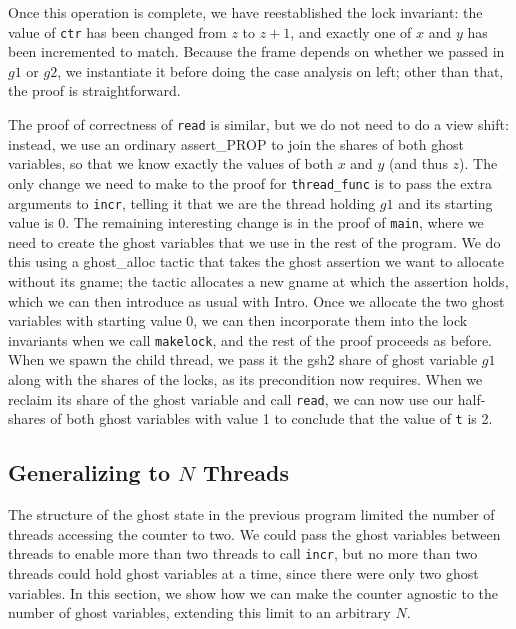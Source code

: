\documentclass[11pt]{article} %
\begin{document}
Once this operation is complete, we have reestablished the lock invariant: the value of \texttt{ctr} has been changed from $z$ to $z + 1$, and exactly one of $x$ and $y$ has been incremented to match. Because the frame depends on whether we passed in $g1$ or $g2$, we instantiate it before doing the case analysis on \textsf{left}; other than that, the proof is straightforward.

The proof of correctness of \texttt{read} is similar, but we do not need to do a view shift: instead, we use an ordinary \textsf{assert\_PROP} to join the shares of both ghost variables, so that we know exactly the values of both $x$ and $y$ (and thus $z$). The only change we need to make to the proof for \texttt{thread\_func} is to pass the extra arguments to \texttt{incr}, telling it that we are the thread holding $g1$ and its starting value is 0. The remaining interesting change is in the proof of \texttt{main}, where we need to create the ghost variables that we use in the rest of the program. We do this using a \textsf{ghost\_alloc} tactic that takes the ghost assertion we want to allocate without its \textsf{gname}; the tactic allocates a new \textsf{gname} at which the assertion holds, which we can then introduce as usual with \textsf{Intro}. Once we allocate the two ghost variables with starting value 0, we can then incorporate them into the lock invariants when we call \texttt{makelock}, and the rest of the proof proceeds as before. When we spawn the child thread, we pass it the \textsf{gsh2} share of ghost variable $g1$ along with the shares of the locks, as its precondition now requires. When we reclaim its share of the ghost variable and call \texttt{read}, we can now use our half-shares of both ghost variables with value 1 to conclude that the value of \texttt{t} is 2.

\subsection{Generalizing to $N$ Threads}
\label{incrN}

The structure of the ghost state in the previous program limited the number of threads accessing the counter to two. We could pass the ghost variables between threads to enable more than two threads to call \texttt{incr}, but no more than two threads could hold ghost variables at a time, since there were only two ghost variables. In this section, we show how we can make the counter agnostic to the number of ghost variables, extending this limit to an arbitrary $N$.
\end{document}
